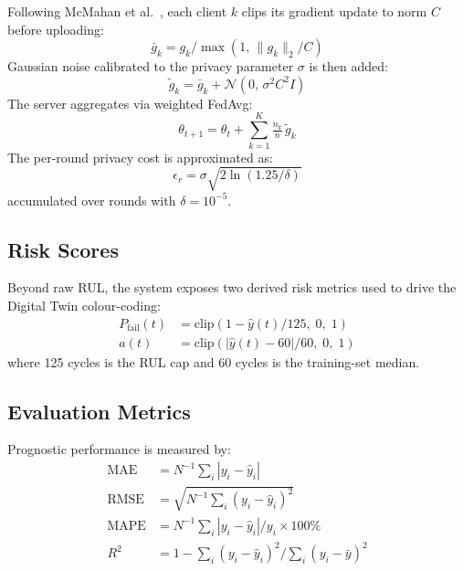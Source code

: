 \documentclass[10pt, journal, letterpaper]{IEEEtran}
\begin{document}
Following McMahan et al.~\cite{mcmahan2017}, each client $k$ clips its
gradient update to norm $C$ before uploading:
\begin{equation}
  \bar{g}_k = g_k \big/ \max\!\left(1,\, \|g_k\|_2 / C\right)
\end{equation}
Gaussian noise calibrated to the privacy parameter $\sigma$ is then added:
\begin{equation}
  \tilde{g}_k = \bar{g}_k + \mathcal{N}(0,\, \sigma^2 C^2 I)
\end{equation}
The server aggregates via weighted FedAvg:
\begin{equation}
  \theta_{t+1} = \theta_t + \sum_{k=1}^{K} \tfrac{n_k}{n}\,\tilde{g}_k
  \label{eq:fedavg}
\end{equation}
The per-round privacy cost is approximated as:
\begin{equation}
  \epsilon_r = \sigma\sqrt{2\ln(1.25/\delta)}
\end{equation}
accumulated over rounds with $\delta = 10^{-5}$.

\subsection{Risk Scores}

Beyond raw RUL, the system exposes two derived risk metrics used to drive
the Digital Twin colour-coding:
\begin{align}
  P_{\text{fail}}(t) &= \mathrm{clip}\!\left(1 - \hat{y}(t)/125,\; 0,\; 1\right)
  \label{eq:pfail}\\
  a(t) &= \mathrm{clip}\!\left(|\hat{y}(t) - 60|/60,\; 0,\; 1\right)
  \label{eq:anomaly}
\end{align}
where 125 cycles is the RUL cap and 60 cycles is the training-set median.

\subsection{Evaluation Metrics}

Prognostic performance is measured by:
\begin{align}
  \mathrm{MAE}  &= N^{-1}\textstyle\sum_{i}|y_i-\hat{y}_i| \label{eq:mae}\\
  \mathrm{RMSE} &= \sqrt{N^{-1}\textstyle\sum_{i}(y_i-\hat{y}_i)^2}
               \label{eq:rmse}\\
  \mathrm{MAPE} &= N^{-1}\textstyle\sum_i |y_i-\hat{y}_i|/y_i \times 100\%
               \label{eq:mape}\\
  R^2           &= 1 - \sum_i(y_i-\hat{y}_i)^2/\sum_i(y_i-\bar{y})^2
               \label{eq:r2}
\end{align}
\end{document}
